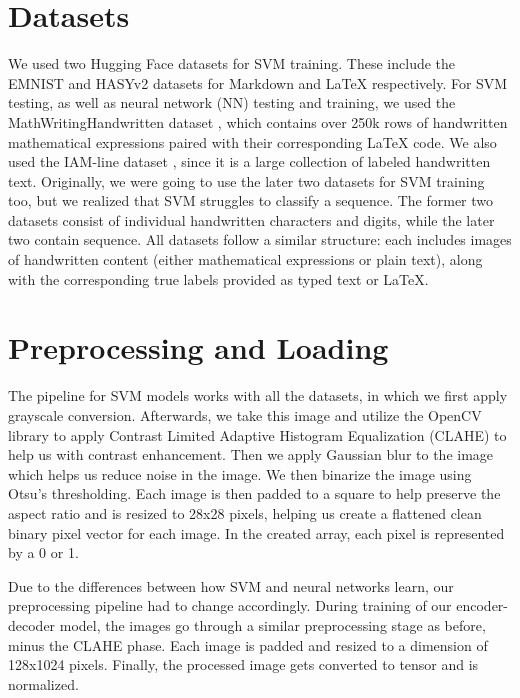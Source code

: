 \documentclass[11pt]{article}
\begin{document}
\section{Datasets}

We used two Hugging Face datasets for SVM training. These include the EMNIST \citep{cohen2017emnistextension} and HASYv2 \citep{thoma2017hasyv2} datasets for Markdown and LaTeX respectively. For SVM testing, as well as neural network (NN) testing and training, we used the MathWritingHandwritten dataset \citep{yo2025mathwritinghandwritten}, which contains over 250k rows of handwritten mathematical expressions paired with their corresponding LaTeX code. We also used the IAM-line dataset \citep{marti2002iam, teklia2024handwrittentext}, since it is a large collection of labeled handwritten text. Originally, we were going to use the later two datasets for SVM training too, but we realized that SVM struggles to classify a sequence. The former two datasets consist of individual handwritten characters and digits, while the later two contain sequence. All datasets follow a similar structure: each includes images of handwritten content (either mathematical expressions or plain text), along with the corresponding true labels provided as typed text or LaTeX.

\section{Preprocessing and Loading}

The pipeline for SVM models works with all the datasets, in which we first apply grayscale conversion. Afterwards, we take this image and utilize the OpenCV library to apply Contrast Limited Adaptive Histogram Equalization (CLAHE) to help us with contrast enhancement. Then we apply Gaussian blur to the image which helps us reduce noise in the image. We then binarize the image using Otsu's thresholding. Each image is then padded to a square to help preserve the aspect ratio and is resized to 28x28 pixels, helping us create a flattened clean binary pixel vector for each image. In the created array, each pixel is represented by a 0 or 1.

Due to the differences between how SVM and neural networks learn, our preprocessing pipeline had to change accordingly. During training of our encoder-decoder model, the images go through a similar preprocessing stage as before, minus the CLAHE phase. Each image is padded and resized to a dimension of 128x1024 pixels. Finally, the processed image gets converted to tensor and is normalized.
\end{document}
